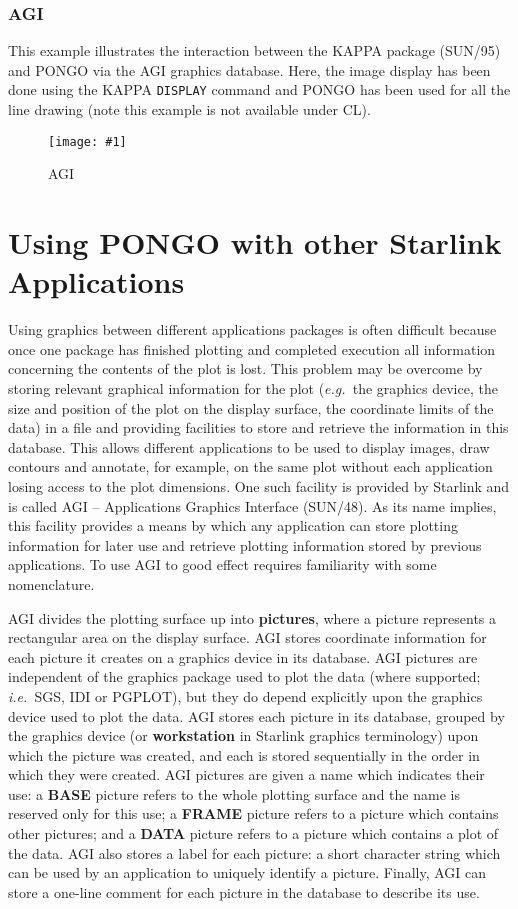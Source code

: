 \documentclass[twoside,11pt]{article}
\newcommand{\htmladdimg}[1]{}
\newcommand{\xref}[3]{#1}
\renewcommand{\_}{\texttt{\symbol{95}}}
\newcommand{\eg}{{\em e.g.\ }}
\newcommand{\ie}{{\em i.e.\ }}
\newcommand{\halfpfig} [4] {
  \begin{figure}[htbp]
    \setlength{\unitlength}{1in}
    \centering\texttt{[image: \#1]}
    \typeout{#1 inserted on page \arabic{page}}
    \caption{#2}
    \label{#2}
  \end{figure}
}
\newcommand{\halfpfig}[4]{
      \htmladdimg{#3}\\
      Figure: \label{#2} #2
   }
\newcommand{\cnam}[1]{{\tt #1}}
\begin{document}
\newpage
\subsubsection{AGI}

This example illustrates the interaction between the \xref{KAPPA
package (SUN/95)}{sun95}{} and PONGO via the \xref{AGI graphics
database}{sun48}{}.  Here, the image display has been done using the
\xref{KAPPA \cnam{DISPLAY}}{sun95}{DISPLAY} command and PONGO has been
used for all the line drawing (note this example is not available
under CL).

\halfpfig{sun137_fig8.ps-tex}{AGI}{agi.gif}{7in}
\newpage


\section{Using PONGO with other Starlink Applications}

Using graphics between different applications packages is often difficult
because once one package has finished plotting and completed execution all
information concerning the contents of the plot is lost.
This problem may be overcome by storing relevant graphical information for the
plot (\eg the graphics device, the size and position of the plot on the display
surface, the coordinate limits of the data) in a file and providing facilities
to store and retrieve the information in this database.
This allows different applications to be used to display images, draw contours
and  annotate, for example, on the same plot without each application losing
access to the plot dimensions.
One such facility is provided by Starlink and is called
\xref{AGI -- Applications Graphics Interface (SUN/48)}{sun48}{}.
As its name implies, this facility provides a means by which any application
can store plotting information for later use and retrieve plotting information
stored by previous applications.
To use AGI to good effect requires familiarity with some nomenclature.

AGI divides the plotting surface up into {\bf pictures}, where a picture
represents a rectangular area on the display surface.
AGI stores coordinate information for each picture it creates on a graphics
device in its database.
AGI pictures are independent of the graphics package used to plot the data
(where supported; \ie SGS, IDI or PGPLOT), but they do depend explicitly upon
the graphics device used to plot the data.
AGI stores each picture in its database, grouped by the graphics device (or
{\bf workstation} in Starlink graphics terminology) upon which the picture was
created, and each is stored sequentially in the order in which they were
created.
AGI pictures are given a name which indicates their use:
a {\bf BASE} picture refers to the whole plotting surface and the name is
reserved only for this use;
a {\bf FRAME} picture refers to a picture which contains other pictures;
and a {\bf DATA} picture refers to a picture which contains a plot of the data.
AGI also stores a label for each picture: a short character string which
can be used by an application to uniquely identify a picture.
Finally, AGI can store a one-line comment for each picture in the database to
describe its use.
\end{document}
